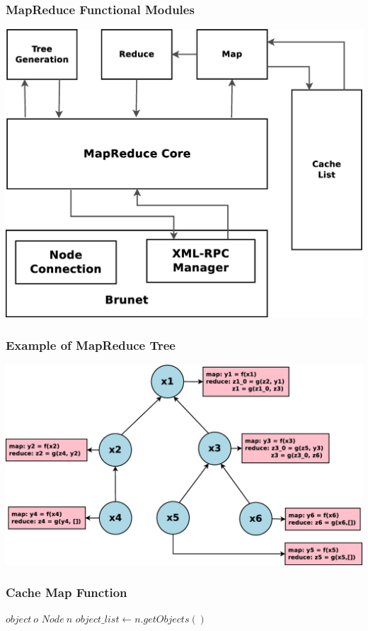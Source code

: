 \documentclass[red]{beamer}
\begin{document}
\begin{frame}
\frametitle{MapReduce Functional Modules}
\begin{center}
\includegraphics[scale=0.2]{figs/mapreduce_query_system}
\end{center}
\end{frame}

\begin{frame}
\frametitle{Example of MapReduce Tree}
\begin{center}
\includegraphics[scale=0.2]{figs/mapreduce_tree}
\end{center}
\end{frame}

\begin{frame}
\frametitle{Cache Map Function}
\begin{algorithmic}[1]
\REQUIRE $object~ o$     
\REQUIRE $Node~ n$
\STATE $object\_list \leftarrow n.getObjects()$ %
  \RETURN \TRUE
\ELSE
  \RETURN \FALSE
\ENDIF
\end{algorithmic}
\end{frame}
\end{document}
